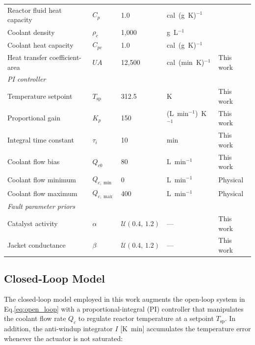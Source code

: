 \documentclass[aps,pre,twocolumn,superscriptaddress]{revtex4-2}
\begin{document}
\begin{table}[t]
\begin{tabular}{lllll}
Reactor fluid heat capacity & $C_p$         & 1.0                  & cal~(g~K)$^{-1}$      & \citet{PerrysHandbook} \\
Coolant density            & $\rho_c$       & 1{,}000              & g~L$^{-1}$            & \citet{PerrysHandbook} \\
Coolant heat capacity      & $C_{pc}$       & 1.0                  & cal~(g~K)$^{-1}$      & \citet{PerrysHandbook} \\
Heat transfer coefficient-area & $U\!A$     & 12{,}500             & cal~(min~K)$^{-1}$    & This work \\
\midrule
\multicolumn{5}{l}{\textit{PI controller}} \\
Temperature setpoint       & $T_\mathrm{sp}$ & 312.5               & K                     & This work \\
Proportional gain          & $K_p$          & 150                  & (L~min$^{-1}$)~K$^{-1}$ & This work \\
Integral time constant     & $\tau_i$       & 10                   & min                   & This work \\
Coolant flow bias          & $Q_{c0}$       & 80                   & L~min$^{-1}$          & This work \\
Coolant flow minimum       & $Q_{c,\min}$   & 0                    & L~min$^{-1}$          & Physical \\
Coolant flow maximum       & $Q_{c,\max}$   & 400                  & L~min$^{-1}$          & Physical \\
\midrule
\multicolumn{5}{l}{\textit{Fault parameter priors}} \\
Catalyst activity          & $\alpha$       & $\mathcal{U}(0.4,\,1.2)$ & — & This work \\
Jacket conductance         & $\beta$        & $\mathcal{U}(0.4,\,1.2)$ & — & This work \\
\hline
\bottomrule
\end{tabular}
\end{table}

\subsection{Closed-Loop Model}
\label{sec:closed_loop}
The closed-loop model employed in this work augments the open-loop
system in Eq.\eqref{eq:open_loop} with a proportional-integral (PI)
controller that manipulates the coolant flow rate $Q_c$ to regulate
reactor temperature at a setpoint $T_\mathrm{sp}$. In addition, the anti-windup integrator $I$
[K~min] accumulates the temperature error whenever the actuator is not saturated:
\end{document}

